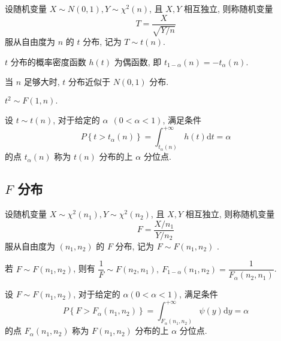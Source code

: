 \begin{definition}[$t$ 分布]
    设随机变量 $ X \sim N(0,1), Y \sim \chi^{2}(n)$, 且 $ X, Y $ 相互独立, 则称随机变量
    $$T=\frac{X}{\sqrt{Y / n}}$$
    服从自由度为 $ n $ 的 $ t $ 分布, 记为 $ T \sim t(n) .$
\end{definition}

\begin{theorem}
    $ t $ 分布的概率密度函数 $ h(t) $ 为偶函数, 即 $ t_{1-\alpha}(n)=-t_{\alpha}(n) .$
\end{theorem}

\begin{theorem}
    当 $ n $ 足够大时, $t $ 分布近似于 $ N(0,1) $ 分布.
\end{theorem}
\begin{theorem}[$t$ 分布与 $F$ 分布]
    $ t^{2} \sim F(1, n) .$
\end{theorem}

\begin{definition}
    设 $ t \sim t(n) $, 对于给定的 $ \alpha~~(0<\alpha<1) $, 满足条件
    $$P\left\{t>t_{\alpha}(n)\right\}=\int_{t_{\alpha}(n)}^{+\infty} h(t) \mathrm{d} t=\alpha$$
    的点 $ t_{\alpha}(n) $ 称为 $ t(n) $ 分布的上 $ \alpha $ 分位点.
\end{definition}

\subsection{\texorpdfstring{$F$}. 分布}

\begin{definition}[$F$ 分布]
    设随机变量 $ X \sim \chi^{2}\left(n_{1}\right), Y \sim \chi^{2}\left(n_{2}\right)$, 且 $ X, Y $ 相互独立, 则称随机变量
    $$F=\frac{X / n_{1}}{Y / n_{2}}$$
    服从自由度为 $ \left(n_{1}, n_{2}\right) $ 的 $ F $ 分布, 记为 $ F \sim F\left(n_{1}, n_{2}\right)$ .
\end{definition}

\begin{theorem}
    若 $ F \sim F\left(n_{1}, n_{2}\right) $, 则有 $ \dfrac{1}{F} \sim F\left(n_{2}, n_{1}\right) ,~F_{1-\alpha}\left(n_{1}, n_{2}\right)=\dfrac{1}{F_{\alpha}\left(n_{2}, n_{1}\right)}$.
\end{theorem}

\begin{theorem}
    设 $ F \sim F\left(n_{1}, n_{2}\right) $, 对于给定的 $ \alpha(0<\alpha<1) $, 满足条件
    $$P\left\{F>F_{\alpha}\left(n_{1}, n_{2}\right)\right\}=\int_{F_{\alpha}\left(n_{1}, n_{2}\right)}^{+\infty} \psi(y) \mathrm{d} y=\alpha$$
    的点 $ F_{\alpha}\left(n_{1}, n_{2}\right) $ 称为 $ F\left(n_{1}, n_{2}\right) $ 分布的上 $ \alpha $ 分位点.
\end{theorem}


